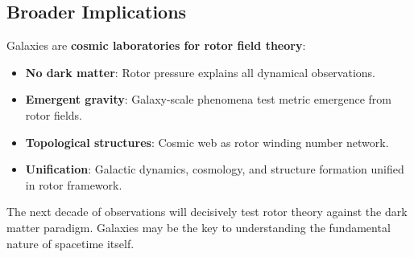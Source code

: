 \documentclass[12pt,a4paper]{article}
\theoremstyle{definition}
\theoremstyle{remark}
\begin{document}
\subsection{Broader Implications}

Galaxies are \textbf{cosmic laboratories for rotor field theory}:
\begin{itemize}
\item \textbf{No dark matter}: Rotor pressure explains all dynamical observations.
\item \textbf{Emergent gravity}: Galaxy-scale phenomena test metric emergence from rotor fields.
\item \textbf{Topological structures}: Cosmic web as rotor winding number network.
\item \textbf{Unification}: Galactic dynamics, cosmology, and structure formation unified in rotor framework.
\end{itemize}

The next decade of observations will decisively test rotor theory against the dark matter paradigm. Galaxies may be the key to understanding the fundamental nature of spacetime itself.
\end{document}
